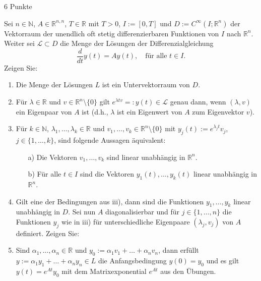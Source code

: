 \documentclass{problemset}
\begin{document}
\begin{problem}[Aufgabe 2]{6 Punkte}

Sei $n \in \mathbb{N}$, $A \in \mathbb{R}^{n,n}$, $T \in \mathbb{R}$ mit $T >
0$, $I := [0, T]$ und $D := C^\infty(I; \mathbb{R}^n)$ der Vektorraum der
unendlich oft stetig differenzierbaren Funktionen von $I$ nach $\mathbb{R}^n$.
Weiter sei $\mathcal{L} \subset D$ die Menge der Lösungen der
Differenzialgleichung
\[ \frac{d}{dt} y(t) = Ay(t), \quad \text{für alle } t \in I. \]
Zeigen Sie:
\begin{enumerate}
    \item Die Menge der Lösungen $L$ ist ein Untervektorraum von $D$.
    \item Für $\lambda \in \mathbb{R}$ und $v \in \mathbb{R}^n \setminus \{0\}$
          gilt $e^{\lambda t v} =: y(t) \in \mathcal{L}$ genau dann, wenn
          $(\lambda, v)$ ein Eigenpaar von $A$ ist (d.h., $\lambda$ ist ein
          Eigenwert von $A$ zum Eigenvektor $v$).
    \item \label{prob:2:iii} Für $k \in \mathbb{N}$, $\lambda_1, \dots, \lambda_k \in \mathbb{R}$
          und $v_1, \dots, v_k \in \mathbb{R}^n \setminus \{0\}$ mit $y_j(t) :=
              e^{\lambda_j t} v_j$, $j \in \{1, \dots, k\}$, sind folgende Aussagen
          äquivalent:
          \begin{itemize}
              \item[a)] Die Vektoren $v_1, \dots, v_k$ sind linear unabhängig
                    in $\mathbb{R}^n$.
              \item[b)] Für alle $t \in I$ sind die Vektoren $y_1(t), \dots,
                    y_k(t)$ linear unabhängig in $\mathbb{R}^n$.
          \end{itemize}
    \item \label{prob:2:iv} Gilt eine der Bedingungen aus iii), dann sind die Funktionen $y_1,
              \dots, y_k$ linear unabhängig in $D$. Sei nun $A$ diagonalisierbar
          und für $j \in \{1, \dots, n\}$ die Funktionen $y_j$ wie in iii) für
          unterschiedliche Eigenpaare $(\lambda_j, v_j)$ von $A$ definiert.
          Zeigen Sie:
    \item Sind $\alpha_1, \dots, \alpha_n \in \mathbb{R}$ und $y_0 := \alpha_1
          v_1 + \dots + \alpha_n v_n$, dann erfüllt $y := \alpha_1 y_1 + \dots
          + \alpha_n y_n \in L$ die Anfangsbedingung $y(0) = y_0$ und es gilt
          $y(t) = e^{At} y_0$ mit dem Matrixexponential $e^{At}$ aus den
          Übungen.
\end{enumerate}


\end{problem}
\end{document}
